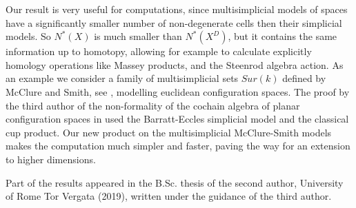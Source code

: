  Our result is very useful for computations, since multisimplicial models of spaces have a significantly smaller number of non-degenerate cells then their simplicial models.
So $N^*(X)$ is much smaller than $N^*(X^D)$, but it contains the same information up to homotopy,
allowing for example
to calculate explicitly homology operations like Massey products, and the Steenrod algebra action.
As an example we consider a family of multisimplicial sets $Sur(k)$ defined  by McClure and Smith, see \cite{MS},  modelling euclidean configuration spaces.
The proof by the third author of the non-formality of the cochain algebra of planar configuration spaces in \cite{formality}  used the Barratt-Eccles simplicial model and the classical cup product.
Our new product on the multisimplicial McClure-Smith models makes the computation much simpler and faster, paving the way for an extension to higher dimensions.

\medskip

Part of the results appeared in the B.Sc. thesis of the second author, University of Rome Tor Vergata (2019), written under the guidance of the third author.